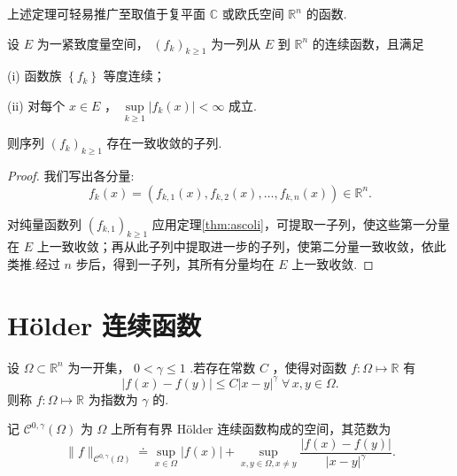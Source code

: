 上述定理可轻易推广至取值于复平面 $\mathbb{C}$ 或欧氏空间 ${\mathbb{R}}^{n}$ 的函数.

\begin{corollary}\label{cor:ascoli-rn-subsequence}
设 $E$ 为一紧致度量空间， ${\left( {f}_{k}\right) }_{k \geq  1}$ 为一列从 $E$ 到 ${\mathbb{R}}^{n}$ 的连续函数，且满足

(i) 函数族 $\left\{  {f}_{k}\right\}$ 等度连续；

(ii) 对每个 $x \in  E$ ， $\mathop{\sup }\limits_{{k \geq  1}}\left| {{f}_{k}\left( x\right) }\right|  < \infty$ 成立.

则序列 ${\left( {f}_{k}\right) }_{k \geq  1}$ 存在一致收敛的子列.
\end{corollary}

\begin{proof}
我们写出各分量:
\[
{f}_{k}\left( x\right)  = \left( {{f}_{k,1}\left( x\right) ,{f}_{k,2}\left( x\right) ,\ldots ,{f}_{k,n}\left( x\right) }\right)  \in  {\mathbb{R}}^{n}.
\]

对纯量函数列 ${\left( {f}_{k,1}\right) }_{k \geq  1}$ 应用定理\ref{thm:ascoli}，可提取一子列，使这些第一分量在 $E$ 上一致收敛；再从此子列中提取进一步的子列，使第二分量一致收敛，依此类推.经过 $n$ 步后，得到一子列，其所有分量均在 $E$ 上一致收敛.
\end{proof}

\section{Hölder 连续函数}
\begin{definition}\label{def:holder-continuous}
    设 $\Omega  \subset  {\mathbb{R}}^{n}$ 为一开集， $0 < \gamma  \leq  1$ .若存在常数 $C$ ，使得对函数 $f : \Omega  \mapsto  \mathbb{R}$ 有
\[
\left| {f\left( x\right)  - f\left( y\right) }\right|  \leq  C{\left| x - y\right| }^{\gamma }\;\forall\,x,y \in  \Omega .
\]
则称 $f : \Omega  \mapsto  \mathbb{R}$ 为指数为 $\gamma$ 的.
\end{definition}
\begin{definition}\label{def:holder-function-space}
    记 ${\mathcal{C}}^{0,\gamma }\left( \Omega \right)$ 为 $\Omega$ 上所有有界 Hölder 连续函数构成的空间，其范数为
\begin{equation}\tag{3.12}\label{eq:holder-norm-0-gamma}
\| f{\| }_{{\mathcal{C}}^{0,\gamma }\left( \Omega \right) } \doteq  \mathop{\sup }\limits_{{x \in  \Omega }}\left| {f\left( x\right) }\right|  + \mathop{\sup }\limits_{{x,y \in  \Omega ,x \neq  y}}\frac{\left| f\left( x\right)  - f\left( y\right) \right| }{{\left| x - y\right| }^{\gamma }}.
\end{equation}
\end{definition}


